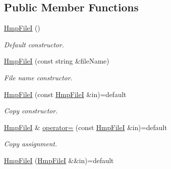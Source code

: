 \subsection*{Public Member Functions}
\begin{DoxyCompactItemize}
\item 
\mbox{\label{classsamp_files_1_1_hmp_file_i_afca3094a6302e44a9a209a33ce0883ec}} 
\hyperlink{classsamp_files_1_1_hmp_file_i_afca3094a6302e44a9a209a33ce0883ec}{Hmp\+FileI} ()
\begin{DoxyCompactList}\small\item\em Default constructor. \end{DoxyCompactList}\item 
\hyperlink{classsamp_files_1_1_hmp_file_i_a61a3b829ed54c8c7e6431747a20f4466}{Hmp\+FileI} (const string \&file\+Name)
\begin{DoxyCompactList}\small\item\em File name constructor. \end{DoxyCompactList}\item 
\mbox{\label{classsamp_files_1_1_hmp_file_i_a9989724aefaeea5520af821a1e3732a7}} 
\hyperlink{classsamp_files_1_1_hmp_file_i_a9989724aefaeea5520af821a1e3732a7}{Hmp\+FileI} (const \hyperlink{classsamp_files_1_1_hmp_file_i}{Hmp\+FileI} \&in)=default
\begin{DoxyCompactList}\small\item\em Copy constructor. \end{DoxyCompactList}\item 
\mbox{\label{classsamp_files_1_1_hmp_file_i_a1e26ee01a8c7a7a5a1b55656f41cee0d}} 
\hyperlink{classsamp_files_1_1_hmp_file_i}{Hmp\+FileI} \& \hyperlink{classsamp_files_1_1_hmp_file_i_a1e26ee01a8c7a7a5a1b55656f41cee0d}{operator=} (const \hyperlink{classsamp_files_1_1_hmp_file_i}{Hmp\+FileI} \&in)=default
\begin{DoxyCompactList}\small\item\em Copy assignment. \end{DoxyCompactList}\item 
\mbox{\label{classsamp_files_1_1_hmp_file_i_a7f1fa0e7336f551e3867780d91d99519}} 
\hyperlink{classsamp_files_1_1_hmp_file_i_a7f1fa0e7336f551e3867780d91d99519}{Hmp\+FileI} (\hyperlink{classsamp_files_1_1_hmp_file_i}{Hmp\+FileI} \&\&in)=default

\end{DoxyCompactItemize}
